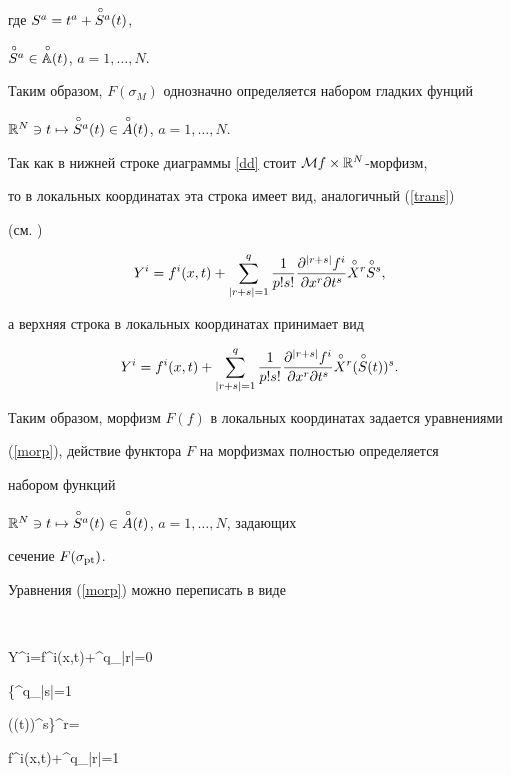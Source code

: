 где $S^a=t^a+\overset{\,\circ}{S}{}^a(t)$,


$\overset{\,\circ}{S}{}^a\in\overset{\,\circ}{{\Bbb A}}{}(t)$, $a=1,\dotsc,N$.


Таким образом, $F(\sigma_M)$  однозначно определяется набором гладких фунций


${\Bbb R}^N\ni t\mapsto\overset{\,\circ}{S}{}^a(t)\in\overset{\,\circ}{A}{}(t)$, $a=1,\dotsc,N$.





Так как в нижней строке диаграммы \eqref{dd} стоит ${\cal M} f\times{\Bbb R}^N$-морфизм,


то в локальных координатах эта строка имеет вид, аналогичный (\ref{trans})


(см. \cite{VSh1})


$$


Y^{i}=f^i(x,t)+\sum^q_{|r+s|=1}\frac{1}{p!s!}\frac{\partial^{|r+s|}f^i}


{\partial x^r\partial t^s}\rad{X}^r\rad{S}^s,


$$


а верхняя строка в локальных координатах принимает вид


\begin{equation}


\label{morp}


Y^{i}=f^i(x,t)+\sum^q_{|r+s|=1}\frac{1}{p!s!}\frac{\partial^{|r+s|}f^i}


{\partial x^r\partial t^s}\rad{X}^r(\rad{S}(t))^s.


\end{equation}


Таким образом, морфизм $F(f)$ в локальных координатах задается уравнениями


(\ref{morp}), действие функтора $F$ на морфизмах полностью определяется


набором функций


${\Bbb R}^N\ni t\mapsto\overset{\,\circ}{S}{}^a(t)\in\overset{\,\circ}{A}{}(t)$, $a=1,\dotsc,N$, задающих


сечение  $F(\sigma_{\operatorname{pt}})$.





Уравнения (\ref{morp}) можно переписать в виде


$$


Y^{i}=f^i(x,t)+\sum^q_{|r|=0}


\bigg\{\sum^q_{|s|=1}


((t))^s\bigg\}^r=


\widehat f{}^i(x,t)+\sum^q_{|r|=1}


